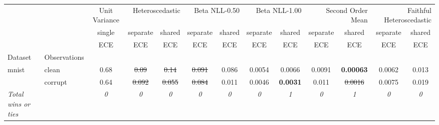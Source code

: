 \begin{tabular}{ll|c|cc|cc|cc|cc|cc}
\toprule
{} & {} & {Unit Variance} & \multicolumn{2}{r}{Heteroscedastic} & \multicolumn{2}{r}{Beta NLL-0.50} & \multicolumn{2}{r}{Beta NLL-1.00} & \multicolumn{2}{r}{Second Order Mean} & \multicolumn{2}{r}{Faithful Heteroscedastic} \\
{} & {} & {single} & {separate} & {shared} & {separate} & {shared} & {separate} & {shared} & {separate} & {shared} & {separate} & {shared} \\
{} & {} & {ECE} & {ECE} & {ECE} & {ECE} & {ECE} & {ECE} & {ECE} & {ECE} & {ECE} & {ECE} & {ECE} \\
{Dataset} & {Observations} & {} & {} & {} & {} & {} & {} & {} & {} & {} & {} & {} \\
\midrule
\multirow[t]{2}{*}{mnist} & clean & 0.68 & \sout{0.09} & \sout{0.14} & \sout{0.091} & 0.086 & 0.0054 & 0.0066 & 0.0091 & \textbf{0.00063} & 0.0062 & 0.013 \\
 & corrupt & 0.64 & \sout{0.092} & \sout{0.055} & \sout{0.084} & 0.011 & 0.0046 & \textbf{0.0031} & 0.011 & \sout{0.0016} & 0.0075 & 0.019 \\
\textit{{Total wins or ties}} &  & \textit{0} & \textit{0} & \textit{0} & \textit{0} & \textit{0} & \textit{0} & \textit{1} & \textit{0} & \textit{1} & \textit{0} & \textit{0} \\
\bottomrule
\end{tabular}
